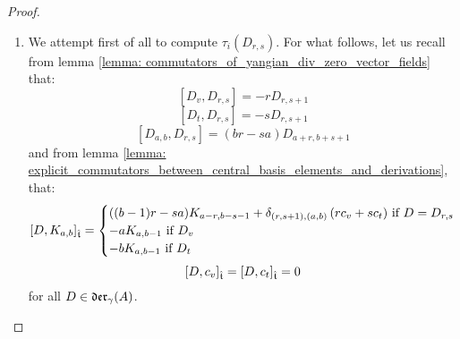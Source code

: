 \begin{proof}
                \begin{enumerate}
                    \item We attempt first of all to compute $\tau_i(D_{r, s})$. For what follows, let us recall from lemma \ref{lemma: commutators_of_yangian_div_zero_vector_fields} that:
                        $$[D_v, D_{r, s}] = -r D_{r, s + 1}$$
                        $$[D_t, D_{r, s}] = -s D_{r, s + 1}$$
                        $$[D_{a, b}, D_{r, s}] = (br - sa) D_{a + r, b + s + 1}$$
                    and from lemma \ref{lemma: explicit_commutators_between_central_basis_elements_and_derivations}, that:
                        $$[D, K_{a, b}]_{\hat{\mathfrak{t}}} =
                            \begin{cases}
                                \text{$((b - 1)r - sa) K_{a - r, b - s - 1} + \delta_{(r, s + 1), (a, b)} \left( r c_v + s c_t \right)$ if $D = D_{r, s}$}
                                \\
                                \text{$-a K_{a, b - 1}$ if $D_v$}
                                \\
                                \text{$-b K_{a, b - 1}$ if $D_t$}
                            \end{cases}
                        $$
                        $$[D, c_v]_{\hat{\mathfrak{t}}} = [D, c_t]_{\hat{\mathfrak{t}}} = 0$$
                    for all $D \in \mathfrak{der}_{\gamma}(A)$.
                    

\end{enumerate}
\end{proof}
